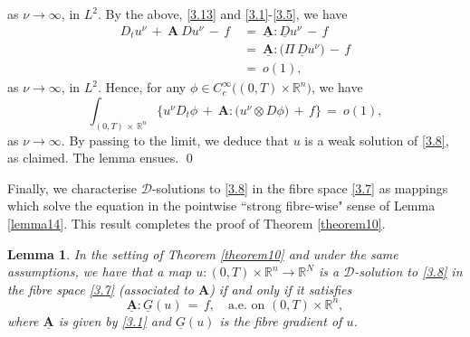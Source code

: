 \documentclass{amsart}
\newtheorem{lemma}[theorem]{Lemma}
\theoremstyle{definition}
\numberwithin{equation}{section}
\begin{document}
as $\nu {\rightarrow} \infty$, in $L^2$. By the above, \eqref{3.13} and \eqref{3.1}-\eqref{3.5}, we have
\[
\begin{split}
D_tu^\nu\, +\ {\textbf{A}}\:Du^\nu\, -\, f\ &=\ {\underline{\textbf{A}}}{\!:\!}  {\underline{D}} u^\nu \, -\, f\\
&=\ {\underline{\textbf{A}}}{\!:\!} \big(\Pi\, {\underline{D}} u^\nu\big) \, -\, f\\
&=\ o(1),
\end{split}
\]
as $\nu {\rightarrow} \infty$, in $L^2$. Hence, for any $\phi \in C^\infty_c\big((0,T)\!{\times}{\mathbb{R}}^n\big)$, we have
\[
\int_{(0,T)\,{\times}\,{\mathbb{R}}^n} \Big\{u^\nu D_t\phi \, +\ {\textbf{A}}{\!:\!}\big(u^\nu {\otimes} D\phi\big)\, +\, f\Big\}\,=\ o(1),
\]
as $\nu {\rightarrow} \infty$. By passing to the limit, we deduce that $u$ is a weak solution of \eqref{3.8}, as claimed. The lemma ensues.     \qed

{\medskip}

Finally, we characterise ${\mathcal{D}}$-solutions to \eqref{3.8} in the fibre space \eqref{3.7} as mappings which solve the equation in the pointwise ``strong fibre-wise" sense of Lemma \ref{lemma14}. This result completes the proof of Theorem \ref{theorem10}.

\begin{lemma} \label{lemma13} In the setting of Theorem \ref{theorem10} and under the same assumptions, we have that a map $u :  (0,T)\! {\times} \!{\mathbb{R}}^n {\longrightarrow} {\mathbb{R}}^N $ is a ${\mathcal{D}}$-solution to \eqref{3.8} in the fibre space \eqref{3.7} (associated to ${\textbf{A}}$) if and only if it satisfies 
\[
{\underline{\textbf{A}}} {\!:\!} \underline{G}(u)\, =\, f, \ \ \ \text{ a.e.\ on }(0,T){\times} {\mathbb{R}}^n, 
\]
where ${\underline{\textbf{A}}}$ is given by \eqref{3.1} and $\underline{G}(u)$ is the fibre gradient of $u$.
\end{lemma}
\end{document}
